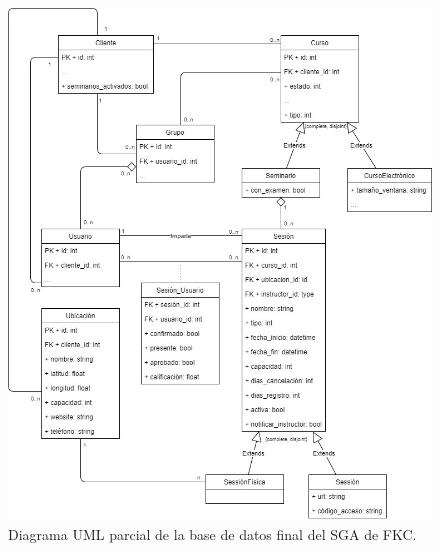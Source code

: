 \begin{figure}[h]
	\begin{center}
		\includegraphics[width=\textwidth]{figuras/database.jpg}
		\caption{Diagrama UML parcial de la base de datos final del SGA de FKC.} \label{fig:baseDeDatosFinal}
	\end{center}
\end{figure}

